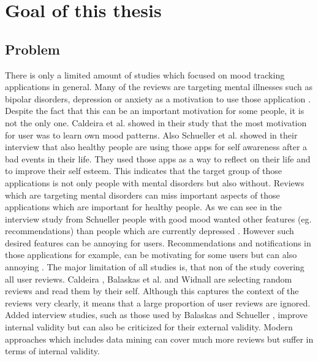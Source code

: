 \chapter{Goal of this thesis}
\label{ch:goal}
\section{Problem}
\label{sec:problem}

There is only a limited amount of studies which focused on mood tracking applications in general.
Many of the reviews are targeting mental illnesses such as bipolar disorders, depression or anxiety as a motivation to use those application \cite{nicholas2015mobile}\cite{Balaskas2022UnderstandingUP}.
Despite the fact that this can be an important motivation for some people, it is not the only one.
Caldeira et al. \cite{caldeira2017mobile} showed in their study that the most motivation for user was to learn own mood patterns. Also Schueller et al. \cite{schueller2021understanding} showed in their interview that also healthy people are using those apps for self awareness after a bad events in their life.
They used those apps as a way to reflect on their life and to improve their self esteem.
This indicates that the target group of those applications is not only people with mental disorders but also without.
Reviews which are targeting mental disorders can miss important aspects of those applications which are important for healthy people.
As we can see in the interview study from Schueller people with good mood wanted other features (eg. recommendations) than people which are currently depressed \cite{schueller2021understanding}. However such desired features can be annoying for users. Recommendations and notifications in those applications for example, can be motivating for some users\cite{widnall2020user} but can also annoying \cite{Balaskas2022UnderstandingUP}.
The major limitation of all studies is, that non of the study covering all user reviews. 
Caldeira \cite{caldeira2017mobile}, Balaskas et al. \cite{Balaskas2022UnderstandingUP} and Widnall \cite{widnall2020user} are selecting random reviews and read them by their self. 
Although this captures the context of the reviews very clearly, it means that a large proportion of user reviews are ignored. 
Added interview studies, such as those used by Balaskas \cite{Balaskas2022UnderstandingUP} and Schueller \cite{Balaskas2022UnderstandingUP}, improve internal validity but can also be criticized for their external validity.
Modern approaches which includes data mining can cover much more reviews but suffer in terms of internal validity.


